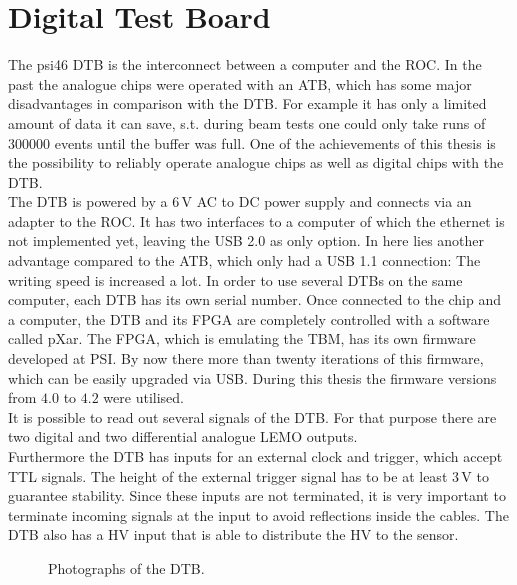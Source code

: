 \section{Digital Test Board}\label{sdtb}
The psi46 \ac{DTB} is the interconnect between a computer and the \ac{ROC}. In the past the analogue chips were operated with an \ac{ATB}, which has some major disadvantages in comparison with the \ac{DTB}. For example it has only a limited amount of data it can save, s.t. during beam tests one could only take runs of $300000$ events until the buffer was full. One of the achievements of this thesis is the possibility to reliably operate analogue chips as well as digital chips with the \ac{DTB}.\\
The \ac{DTB} is powered by a $6\,$V AC to DC power supply and connects via an adapter to the \ac{ROC}. It has two interfaces to a computer of which the ethernet is not implemented yet, leaving the USB 2.0 as only option. In here lies another advantage compared to the \ac{ATB}, which only had a USB 1.1 connection: The writing speed is increased a lot. In order to use several \ac{DTB}s on the same computer, each \ac{DTB} has its own serial number. Once connected to the chip and a computer, the \ac{DTB} and its \ac{FPGA} are completely controlled with a software called pXar. The \ac{FPGA}, which is emulating the \ac{TBM}, has its own firmware developed at \ac{PSI}. By now there more than twenty iterations of this firmware, which can be easily upgraded via USB. During this thesis the firmware versions from $4.0$ to $4.2$ were utilised.\\
It is possible to read out several signals of the \ac{DTB}. For that purpose there are two digital and two differential analogue LEMO outputs.\\
Furthermore the \ac{DTB} has inputs for an external clock and trigger, which accept \ac{TTL} signals. The height of the external trigger signal has to be at least $3\,$V to guarantee stability. Since these inputs are not terminated, it is very important to terminate incoming signals at the input to avoid reflections inside the cables. The \ac{DTB} also has a \ac{HV} input that is able to distribute the \ac{HV} to the sensor.
\begin{figure}[ht]
	\centering
	\hfill
	\caption{Photographs of the \ac{DTB}.}
	\label{pdtb}
\end{figure}\no
